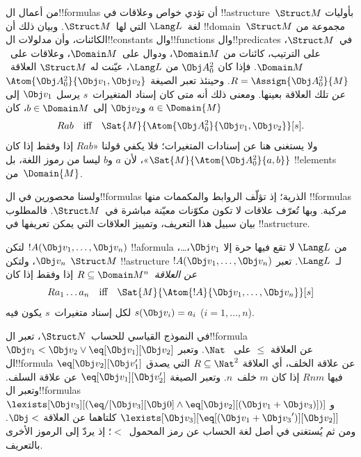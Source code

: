\documentclass[../../../include/open-logic-section]{subfiles}
\begin{document}


\begin{explain}
من أعمال ال!!{formula}s أن تؤدي خواص وعلاقات في
!!a{structure}~$\Struct M$ بأوليات لغة~$\Lang L$
التي لها~$\Struct M$. وبيان ذلك أن !!{domain}~$\Struct M$
مجموعة من الكائنات، وأن مدلولات ال!!{constant}s وال!!{function}s
وال!!{predicate}s في~$\Struct M$، على الترتيب، كائنات من
$\Domain M$، ودوال على~$\Domain M$، وعلاقات على~$\Domain M$.
فإذا كان $\Obj A^2_0$ من $\Lang L$، عيّنت له
$\Struct M$ العلاقة~$R = \Assign{{\Obj
  A^2_0}}{M}$. وحينئذ تعبر الصيغة $\Atom{\Obj A^2_0}{\Obj v_1, \Obj v_2}$
\emph{عن} تلك العلاقة بعينها. ومعنى ذلك أنه متى كان إسناد
المتغيرات~$s$ يرسل $\Obj v_1$ إلى $a \in \Domain{M}$ و$\Obj v_2$
إلى $b \in \Domain M$، كان
\[
Rab \text{\quad iff\quad} \Sat{M}{\Atom{\Obj A^2_0}{\Obj v_1, \Obj v_2}}[s].
\]
ولا يستغنى هنا عن إسنادات المتغيرات؛ فلا يكفي قولنا
«$Rab$ إذا وفقط إذا كان $\Sat{M}{\Atom{\Obj A^2_0}{a, b}}$»،
لأن $a$ و$b$ ليسا من رموز اللغة، بل !!{element}s
من~$\Domain{M}$.

ولسنا محصورين في ال!!{formula}s الذرية؛ إذ تؤلّف الروابط
والمكممات منها !!{formula}s مركبة. وبها تُعرّف علاقات لا تكون
مكوّنات معيّنة مباشرة في~$\Struct M$. فالمطلوب بيان سبيل
هذا التعريف، وتمييز العلاقات التي يمكن تعريفها في !!a{structure}.
\end{explain}

\begin{defn}
لتكن $!A(\Obj v_1,\dots, \Obj v_n)$ !!a{formula} من $\Lang L$ لا
تقع فيها حرة إلا $\Obj v_1$،\dots، $\Obj v_n$، ولتكن $\Struct M$
!!a{structure} لـ~$\Lang L$. تعبر $!A(\Obj v_1,\dots, \Obj v_n)$
\emph{عن العلاقة}~$R \subseteq \Domain M^n$ إذا وفقط إذا كان
\[
Ra_1\dots a_n \text{\quad iff\quad} \Sat{M}{\Atom{!A}{\Obj
    v_1,\dots, \Obj v_n}}[s]
\]
لكل إسناد متغيرات~$s$ يكون فيه $s(\Obj v_i) = a_i$ ($i = 1,
\dots, n$).
\end{defn}

\begin{ex}
في النموذج القياسي للحساب~$\Struct N$، تعبر ال!!{formula} $\Obj
v_1 < \Obj v_2 \lor \eq[\Obj v_1][\Obj v_2]$ عن العلاقة $\le$ على
~$\Nat$. وتعبر ال!!{formula} $\eq[\Obj v_2][\Obj v_1']$ عن علاقة
الخلف، أي العلاقة $R \subseteq \Nat^2$ التي يصدق فيها $Rnm$ إذا كان
$m$ خلف~$n$. وتعبر الصيغة $\eq[\Obj v_1][\Obj v_2']$ عن علاقة السلف.
وتعبر ال!!{formula}s $\lexists[\Obj v_3][(\eq/[\Obj v_3][\Obj 0] \land
  \eq[\Obj v_2][(\Obj v_1 + \Obj v_3)])]$ و$\lexists[\Obj
  v_3][\eq[(\Obj v_1 + {\Obj v_3}')][\Obj v_2]]$ كلتاهما عن العلاقة
$\Obj <$. ومن ثم يُستغنى في أصل لغة الحساب عن رمز المحمول~$<$؛
إذ يردّ إلى الرموز الأخرى بالتعريف.
\end{ex}
\end{document}
